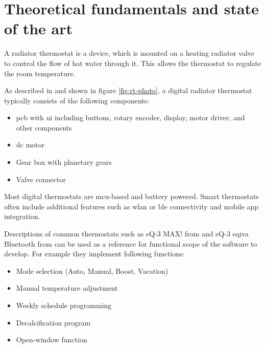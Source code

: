 %
%

\chapter{Theoretical fundamentals and state of the art}
\label{chap:Theoretical fundamentals and state of the art}
%
A radiator thermostat is a device, which is mounted on a heating radiator valve to control the flow of hot water through it. This allows the thermostat to regulate the room temperature.

As described in \cite{ELVjournal.2012} and shown in figure \ref{fig:rt-photo}, a digital radiator thermostat typically consists of the following components:

\begin{itemize}
	\item \ac{pcb} with \ac{ui} including buttons, rotary encoder, display, motor driver, and other components
	\item \ac{dc} motor
	\item Gear box with planetary gears
	\item Valve connector
\end{itemize}

Most digital thermostats are \ac{mcu}-based and battery powered. Smart thermostats often include additional features such as \ac{wlan} or \ac{ble} connectivity and mobile app integration. 

Descriptions of common thermostats such as eQ-3 MAX! from \cite{ELVjournal.2012} and eQ-3 eqiva Bluetooth from \cite{eQ3AG.05.2018} can be used as a reference for functional scope of the software to develop. For example they implement following functions:

\begin{itemize}
	\item Mode selection (Auto, Manual, Boost, Vacation)
	\item Manual temperature adjustment
	\item Weekly schedule programming
	\item Decalcification program
	\item Open-window function
\end{itemize}


